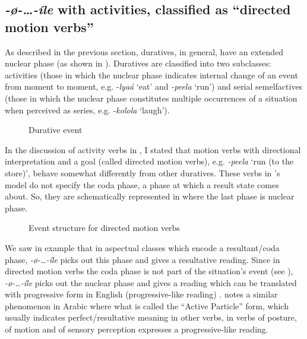 \documentclass[output=paper,newtxmath,modfonts,nonflat,draftmode]{langsci/langscibook}
\begin{document}
\subsection{\textit{-ø-…-íle} with activities, classified as ``directed motion verbs''}\label{sec:kanijo:4.3}

As described in the previous section, duratives, in general, have an extended nuclear phase (as shown in ). Duratives are classified into two subclasses: activities (those in which the nuclear phase indicates internal change of an event from moment to moment, e.g. -\textit{lyaá} ‘eat’ and \textit{-peela} ‘run’) and serial semelfactives (those in which the nuclear phase constitutes multiple occurrences of a situation when perceived as series, e.g. -\textit{kolola} ‘laugh’). 

\begin{figure}
\caption{Durative event\label{fig:kanijo:9}}
\end{figure} 

In the discussion of activity verbs in , I stated that motion verbs with directional interpretation and a goal (called directed motion verbs), e.g. \textit{-peela} ‘run (to the store)’, behave somewhat differently from other duratives. These verbs in \citeauthor{Botne2000}'s model do not specify the coda phase, a phase at which a result state comes about. So, they are schematically represented in  where the last phase is nuclear phase. 


\begin{figure}
\caption{Event structure for directed motion verbs\label{fig:kanijo:10}}
\end{figure}

We saw in example  that in aspectual classes which encode a resultant/coda phase, \textit{-ø-…-íle} picks out this phase and gives a resultative reading. Since in directed motion verbs the coda phase is not part of the situation’s event (see ), \textit{-ø-…-íle} picks out the nuclear phase and gives a reading which can be translated with progressive form in English (progressive-like reading) . \citet[194]{Ebert1995} notes a similar phenomenon in Arabic where what is called the ``Active Particle'' form, which usually indicates perfect/resultative meaning in other verbs, in verbs of posture, of motion and of sensory perception expresses a progressive-like reading.
\end{document}
